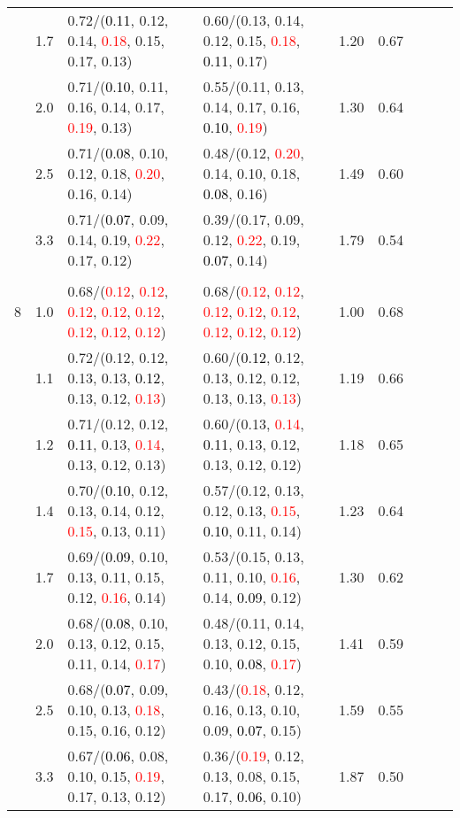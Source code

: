 \documentclass[10pt,a4paper]{report}
\begin{document}
\begin{table}[!htbp]
\begin{center}
{\begin{tabular}{ccllccccc}
			&1.7&0.72/(\textcolor{black}{0.11}, 0.12, 0.14, \textcolor{red}{0.18}, 0.15, 0.17, 0.13)&0.60/(0.13, 0.14, 0.12, 0.15, \textcolor{red}{0.18}, \textcolor{black}{0.11}, 0.17)&1.20&0.67\\
			&2.0&0.71/(\textcolor{black}{0.10}, 0.11, 0.16, 0.14, 0.17, \textcolor{red}{0.19}, 0.13)&0.55/(0.11, 0.13, 0.14, 0.17, 0.16, \textcolor{black}{0.10}, \textcolor{red}{0.19})&1.30&0.64\\
			&2.5&0.71/(\textcolor{black}{0.08}, 0.10, 0.12, 0.18, \textcolor{red}{0.20}, 0.16, 0.14)&0.48/(0.12, \textcolor{red}{0.20}, 0.14, 0.10, 0.18, \textcolor{black}{0.08}, 0.16)&1.49&0.60\\
			&3.3&0.71/(\textcolor{black}{0.07}, 0.09, 0.14, 0.19, \textcolor{red}{0.22}, 0.17, 0.12)&0.39/(0.17, 0.09, 0.12, \textcolor{red}{0.22}, 0.19, \textcolor{black}{0.07}, 0.14)&1.79&0.54\\
			&&&&\\
			8			&1.0&0.68/(\textcolor{red}{0.12}, \textcolor{red}{0.12}, \textcolor{red}{0.12}, \textcolor{red}{0.12}, \textcolor{red}{0.12}, \textcolor{red}{0.12}, \textcolor{red}{0.12}, \textcolor{red}{0.12})&0.68/(\textcolor{red}{0.12}, \textcolor{red}{0.12}, \textcolor{red}{0.12}, \textcolor{red}{0.12}, \textcolor{red}{0.12}, \textcolor{red}{0.12}, \textcolor{red}{0.12}, \textcolor{red}{0.12})&1.00&0.68\\
			&1.1&0.72/(0.12, 0.12, 0.13, 0.13, \textcolor{black}{0.12}, 0.13, 0.12, \textcolor{red}{0.13})&0.60/(\textcolor{black}{0.12}, 0.12, 0.13, 0.12, 0.12, 0.13, 0.13, \textcolor{red}{0.13})&1.19&0.66\\
			&1.2&0.71/(0.12, 0.12, \textcolor{black}{0.11}, 0.13, \textcolor{red}{0.14}, 0.13, 0.12, 0.13)&0.60/(0.13, \textcolor{red}{0.14}, \textcolor{black}{0.11}, 0.13, 0.12, 0.13, 0.12, 0.12)&1.18&0.65\\
			&1.4&0.70/(\textcolor{black}{0.10}, 0.12, 0.13, 0.14, 0.12, \textcolor{red}{0.15}, 0.13, 0.11)&0.57/(0.12, 0.13, 0.12, 0.13, \textcolor{red}{0.15}, \textcolor{black}{0.10}, 0.11, 0.14)&1.23&0.64\\
			&1.7&0.69/(\textcolor{black}{0.09}, 0.10, 0.13, 0.11, 0.15, 0.12, \textcolor{red}{0.16}, 0.14)&0.53/(0.15, 0.13, 0.11, 0.10, \textcolor{red}{0.16}, 0.14, \textcolor{black}{0.09}, 0.12)&1.30&0.62\\
			&2.0&0.68/(\textcolor{black}{0.08}, 0.10, 0.13, 0.12, 0.15, 0.11, 0.14, \textcolor{red}{0.17})&0.48/(0.11, 0.14, 0.13, 0.12, 0.15, 0.10, \textcolor{black}{0.08}, \textcolor{red}{0.17})&1.41&0.59\\
			&2.5&0.68/(\textcolor{black}{0.07}, 0.09, 0.10, 0.13, \textcolor{red}{0.18}, 0.15, 0.16, 0.12)&0.43/(\textcolor{red}{0.18}, 0.12, 0.16, 0.13, 0.10, 0.09, \textcolor{black}{0.07}, 0.15)&1.59&0.55\\
			&3.3&0.67/(\textcolor{black}{0.06}, 0.08, 0.10, 0.15, \textcolor{red}{0.19}, 0.17, 0.13, 0.12)&0.36/(\textcolor{red}{0.19}, 0.12, 0.13, 0.08, 0.15, 0.17, \textcolor{black}{0.06}, 0.10)&1.87&0.50\\
			\bottomrule
		\end{tabular}}
	\end{center}
\end{table}
\end{document}
